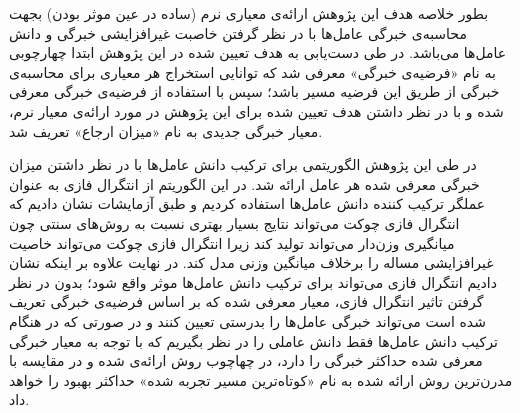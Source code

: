 بطور خلاصه هدف این پژوهش ارائه‌ی معیاری نرم (ساده در عین موثر بودن) بجهت محاسبه‌ی خبرگی عامل‌ها با در نظر گرفتن خاصبت غیرافزایشی  خبرگی و دانش عامل‌ها می‌باشد. در طی دست‌یابی به هدف تعیین شده در این پژوهش ابتدا چهارچوبی به نام «فرضیه‌ی خبرگی» معرفی شد که توانایی استخراج هر معیاری برای محاسبه‌ی خبرگی از طریق این فرضیه مسیر باشد؛ سپس با استفاده از فرضیه‌ی خبرگی معرفی شده و با در نظر داشتن هدف تعیین شده برای این پژوهش در مورد ارائه‌ی معیار نرم، معیار خبرگی جدیدی به نام «میزان ارجاع» تعریف شد.

در طی این پژوهش الگوریتمی برای ترکیب دانش‌ عامل‌ها با در نظر داشتن میزان خبرگی معرفی شده هر عامل ارائه شد. در این الگوریتم از انتگرال فازی به عنوان عملگر ترکیب کننده دانش عامل‌ها استفاده کردیم و طبق آزمایشات نشان دادیم که انتگرال فازی چوکت می‌تواند نتایج بسیار بهتری نسبت به روش‌های سنتی چون میانگیری وزن‌دار می‌تواند تولید کند زیرا انتگرال فازی چوکت می‌تواند خاصیت غیرافزایشی مساله را برخلاف میانگین وزنی مدل کند. در نهایت علاوه بر اینکه نشان دادیم انتگرال فازی می‌تواند برای ترکیب دانش عامل‌ها موثر واقع شود؛ بدون در نظر گرفتن تاثیر انتگرال فازی، معیار معرفی شده که بر اساس فرضیه‌ی خبرگی تعریف شده است می‌تواند خبرگی عامل‌ها را بدرستی تعیین کنند و در صورتی که در هنگام ترکیب دانش عامل‌ها فقط دانش عاملی را در نظر بگیریم که با توجه به معیار خبرگی معرفی شده حداکثر خبرگی را دارد، در چهاچوب روش ارائه‌ی شده و در مقایسه با مدرن‌ترین روش ارائه شده به نام «کوتاه‌ترین مسیر تجربه شده» حداکثر بهبود را خواهد داد.